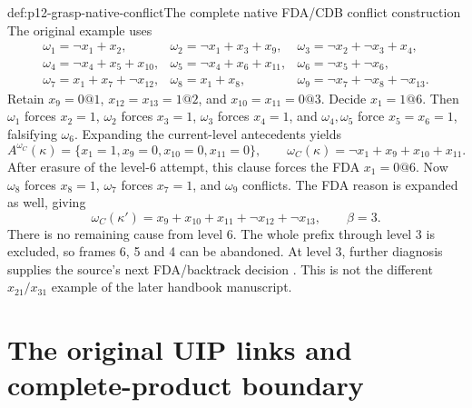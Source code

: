 \begin{hbexample}{def:p12-grasp-native-conflict}{The complete native FDA/CDB conflict construction}
The original example uses
\[
\begin{array}{lll}
 \omega_1=\neg x_1+x_2,&\omega_2=\neg x_1+x_3+x_9,&
 \omega_3=\neg x_2+\neg x_3+x_4,\\
 \omega_4=\neg x_4+x_5+x_{10},&
 \omega_5=\neg x_4+x_6+x_{11},&\omega_6=\neg x_5+\neg x_6,\\
 \omega_7=x_1+x_7+\neg x_{12},&\omega_8=x_1+x_8,&
 \omega_9=\neg x_7+\neg x_8+\neg x_{13}.
\end{array}
\]
Retain \(x_9=0@1\), \(x_{12}=x_{13}=1@2\), and
\(x_{10}=x_{11}=0@3\).  Decide \(x_1=1@6\).  Then \(\omega_1\)
forces \(x_2=1\), \(\omega_2\) forces \(x_3=1\), \(\omega_3\)
forces \(x_4=1\), and \(\omega_4,\omega_5\) force \(x_5=x_6=1\),
falsifying \(\omega_6\).  Expanding the current-level antecedents yields
\[
 A^{\omega_C}(\kappa)=\{x_1=1,x_9=0,x_{10}=0,x_{11}=0\},\qquad
 \omega_C(\kappa)=\neg x_1+x_9+x_{10}+x_{11}.
\]
After erasure of the level-6 attempt, this clause forces the FDA \(x_1=0@6\).
Now \(\omega_8\) forces \(x_8=1\), \(\omega_7\) forces \(x_7=1\),
and \(\omega_9\) conflicts.  The FDA reason is expanded as well, giving
\[
 \omega_C(\kappa')=x_9+x_{10}+x_{11}+\neg x_{12}+\neg x_{13},\qquad
 \beta=3.
\]
There is no remaining cause from level 6.  The whole prefix through level 3
is excluded, so frames 6, 5 and 4 can be abandoned.  At level 3, further
diagnosis supplies the source's next FDA/backtrack decision
\cite[Figs.~1, 4; Eqs.~(5)--(7)]{MarquesSilvaSakallah1999}.
This is not the different \(x_{21}/x_{31}\) example of the later handbook manuscript.
\end{hbexample}

\section{The original UIP links and complete-product boundary}

